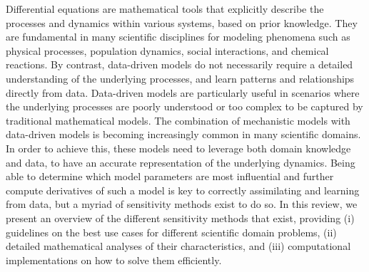 Differential equations are mathematical tools that explicitly describe the processes and dynamics within various systems, based on prior knowledge. They are fundamental in many scientific disciplines for modeling phenomena such as physical processes, population dynamics, social interactions, and chemical reactions.
By contrast, data-driven models do not necessarily require a detailed understanding of the underlying processes, and learn patterns and relationships directly from data. Data-driven models are particularly useful in scenarios where the underlying processes are poorly understood or too complex to be captured by traditional mathematical models.
The combination of mechanistic models with data-driven models is becoming increasingly common in many scientific domains. 
In order to achieve this, these models need to leverage both domain knowledge and data, to have an accurate representation of the underlying dynamics. 
Being able to determine which model parameters are most influential and further compute derivatives of such a model is key to correctly assimilating and learning from data, but a myriad of sensitivity methods exist to do so. 
In this review, we present an overview of the different sensitivity methods that exist, providing (i) guidelines on the best use cases for different scientific domain problems, (ii) detailed mathematical analyses of their characteristics, and (iii) computational implementations on how to solve them efficiently. 
